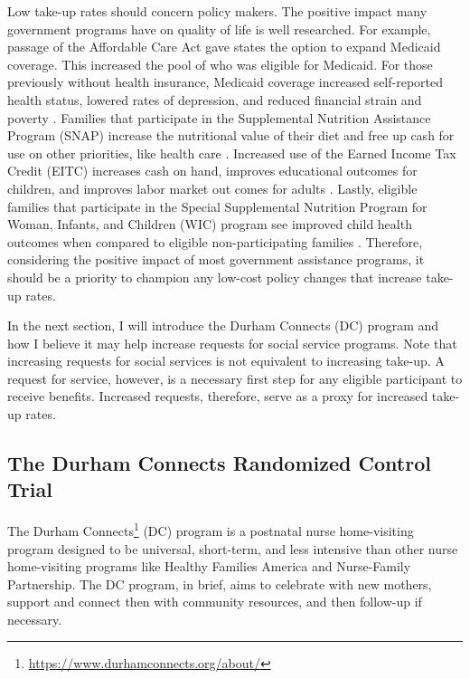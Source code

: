 \documentclass[12pt,letterpaperpaper,]{book}
\renewcommand{\href}[2]{#2\footnote{\url{#1}}}
\begin{document}
Low take-up rates should concern policy makers. The positive impact many
government programs have on quality of life is well researched. For
example, passage of the Affordable Care Act gave states the option to
expand Medicaid coverage. This increased the pool of who was eligible
for Medicaid. For those previously without health insurance, Medicaid
coverage increased self-reported health status, lowered rates of
depression, and reduced financial strain and poverty
\citep{baicker_oregon_2013, sommers_mortality_2012, sommers_poverty-reducing_2013}.
Families that participate in the Supplemental Nutrition Assistance
Program (SNAP) increase the nutritional value of their diet and free up
cash for use on other priorities, like health care
\citep{bartfeld_snap_2015, sonik_massachusetts_2016, miller_using_2017}.
Increased use of the Earned Income Tax Credit (EITC) increases cash on
hand, improves educational outcomes for children, and improves labor
market out comes for adults
\citep{grogger_effects_2003, bhargava_why_2012, dahl_impact_2012}.
Lastly, eligible families that participate in the Special Supplemental
Nutrition Program for Woman, Infants, and Children (WIC) program see
improved child health outcomes when compared to eligible
non-participating families \citep{bitler_does_2005}. Therefore,
considering the positive impact of most government assistance programs,
it should be a priority to champion any low-cost policy changes that
increase take-up rates.

In the next section, I will introduce the Durham Connects (DC) program
and how I believe it may help increase requests for social service
programs. Note that increasing requests for social services is not
equivalent to increasing take-up. A request for service, however, is a
necessary first step for any eligible participant to receive benefits.
Increased requests, therefore, serve as a proxy for increased take-up
rates.

\subsection*{The Durham Connects Randomized Control
Trial}\label{the-durham-connects-randomized-control-trial}

The \href{https://www.durhamconnects.org/about/}{Durham Connects} (DC)
program is a postnatal nurse home-visiting program designed to be
universal, short-term, and less intensive than other nurse home-visiting
programs like Healthy Families America and Nurse-Family Partnership. The
DC program, in brief, aims to celebrate with new mothers, support and
connect then with community resources, and then follow-up if necessary.
\end{document}
